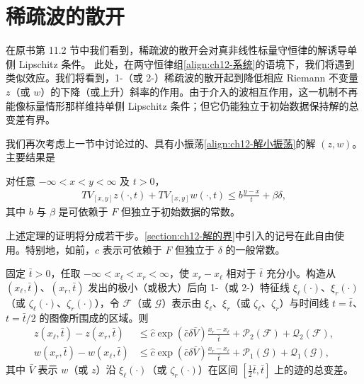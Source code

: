 \documentclass[../../main.tex]{subfiles}
\begin{document}
\section{稀疏波的散开}\label{section:ch12-稀疏波的散开}

在原书第 11.2 节中我们看到，稀疏波的散开会对真非线性标量守恒律的解诱导单侧 Lipschitz 条件。
此处，在两守恒律组\eqref{align:ch12-系统}的语境下，我们将遇到类似效应。我们将看到，1-（或 2-）稀疏波的散开起到降低相应 Riemann 不变量 $z$（或 $w$）的下降（或上升）斜率的作用。由于介入的波相互作用，这一机制不再能像标量情形那样维持单侧 Lipschitz 条件；但它仍能独立于初始数据保持解的总变差有界。

我们再次考虑上一节中讨论过的、具有小振荡\eqref{align:ch12-解小振荡}的解 $(z,w)$。主要结果是

\begin{theorem}\label{theorem:ch12-TV散开}
对任意 $-\infty<x<y<\infty$ 及 $t>0$，
\begin{align}
TV_{[x,y]}z(\cdot,t)+TV_{[x,y]}w(\cdot,t)\leqslant b\frac{y-x}{t}+\beta\delta,
\label{align:ch12-TV散开}
\end{align}
其中 $b$ 与 $\beta$ 是可依赖于 $F$ 但独立于初始数据的常数。
\end{theorem}

上述定理的证明将分成若干步。\cref{section:ch12-解的界}中引入的记号在此自由使用。特别地，如前，$c$ 表示可依赖于 $F$ 但独立于 $\delta$ 的一般常数。

\begin{lemma}\label{lemma:ch12-散开估计}
固定 $\bar t>0$，任取 $-\infty<x_\ell<x_r<\infty$，使 $x_r-x_\ell$ 相对于 $\bar t$ 充分小。构造从 $(x_\ell,\bar t)$、$(x_r,\bar t)$ 发出的极小（或极大）后向 1-（或 2-）特征线 $\xi_\ell(\cdot)$、$\xi_r(\cdot)$（或 $\zeta_\ell(\cdot)$、$\zeta_r(\cdot)$），令 $\mathscr{F}$（或 $\mathscr{G}$）表示由 $\xi_\ell$、$\xi_r$（或 $\zeta_\ell$、$\zeta_r$）与时间线 $t=\bar t$、$t=\bar t/2$ 的图像所围成的区域。则
\begin{align}
z(x_\ell,\bar t)-z(x_r,\bar t)&\leqslant\hat c\exp(\bar c\delta\bar V)\frac{x_r-x_\ell}{\bar t}+\mathscr{P}_2(\mathscr{F})+\mathscr{Q}_2(\mathscr{F}),
\label{align:ch12-散开估计1}\\
w(x_r,\bar t)-w(x_\ell,\bar t)&\leqslant\hat c\exp(\bar c\delta\bar V)\frac{x_r-x_\ell}{\bar t}+\mathscr{P}_1(\mathscr{G})+\mathscr{Q}_1(\mathscr{G}),
\label{align:ch12-散开估计2}
\end{align}
其中 $\bar V$ 表示 $w$（或 $z$）沿 $\xi_\ell(\cdot)$（或 $\zeta_r(\cdot)$）在区间 $[\frac12\bar t,\bar t]$ 上的迹的总变差。
\end{lemma}
\end{document}
